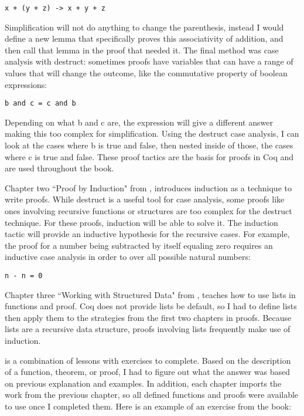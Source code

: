 \documentclass[10pt,twocolumn]{article}
\begin{document}
\begin{lstlisting}
x + (y + z) -> x + y + z
\end{lstlisting}

Simplification will not do anything to change the parenthesis, instead I would define a new lemma that specifically proves this associativity of addition, and then call that lemma in the proof that needed it. The final method was case analysis with destruct: sometimes proofs have variables that can have a range of values that will change the outcome, like the commutative property of boolean expressions:

\begin{lstlisting}
b and c = c and b
\end{lstlisting}

Depending on what b and c are, the expression will give a different answer making this too complex for simplification.  Using the destruct case analysis, I can look at the cases where b is true and false, then nested inside of those, the cases where c is true and false. These proof tactics are the basis for proofs in Coq and are used throughout the book.

Chapter two ``Proof by Induction" from \textcite{Pierce2021Software}, introduces induction as a technique to write proofs. While destruct is a useful tool for case analysis, some proofs like ones involving recursive functions or structures are too complex for the destruct technique. For these proofs, induction will be able to solve it. The induction tactic will provide an inductive hypothesis for the recursive cases. For example, the proof for a number being subtracted by itself equaling zero requires an inductive case analysis in order to over all possible natural numbers:

\begin{lstlisting}
n - n = 0
\end{lstlisting}

Chapter three ``Working with Structured Data" from \textcite{Pierce2021Software}, teaches how to use lists in functions and proof. Coq does not provide lists be default, so I had to define lists then apply them to the strategies from the first two chapters in proofs. Because lists are a recursive data structure, proofs involving lists frequently make use of induction.

\textcite{Pierce2021Software} is a combination of lessons with exercises to complete. Based on the description of a function, theorem, or proof, I had to figure out what the answer was based on previous explanation and examples. In addition, each chapter imports the work from the previous chapter, so all defined functions and proofs were available to use once I completed them. Here is an example of an exercise from the book:
\end{document}
